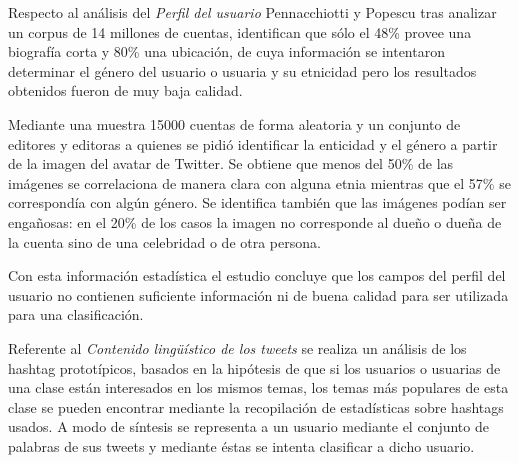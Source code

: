 	        Respecto al análisis del \emph{Perfil del usuario} Pennacchiotti y Popescu tras analizar un corpus de
	        14 millones de cuentas, identifican que sólo el 48\% provee una biografía corta y 80\% una ubicación, de cuya información se intentaron determinar el género del usuario o usuaria y su etnicidad pero los resultados obtenidos fueron de muy baja calidad. 
	        
	        Mediante una muestra 15000 cuentas de forma aleatoria y un conjunto de editores y editoras a quienes se pidió identificar la enticidad y el género a partir de la imagen del avatar de Twitter. Se obtiene que menos del 50\% de las imágenes se correlaciona de manera clara con alguna etnia mientras que el 57\% se correspondía con algún género. Se identifica también que las imágenes podían ser engañosas: en el 20\% de los casos la imagen no corresponde al dueño o dueña de la cuenta sino de una celebridad o de otra persona.
	        
	         Con esta información estadística el estudio concluye que los campos del perfil del usuario no contienen suficiente información ni de buena calidad para ser utilizada para una clasificación.
	        
	        
	        
	        
	        Referente al \emph{Contenido lingüístico de los tweets} se realiza un análisis de los hashtag prototípicos, basados en la hipótesis de que si los usuarios o usuarias de una clase están interesados en los mismos temas, los temas más populares de esta clase se pueden encontrar mediante la recopilación de estadísticas sobre hashtags usados. A modo de síntesis se representa a un usuario mediante el conjunto de palabras de sus tweets y mediante éstas se intenta clasificar a dicho usuario.
	               
